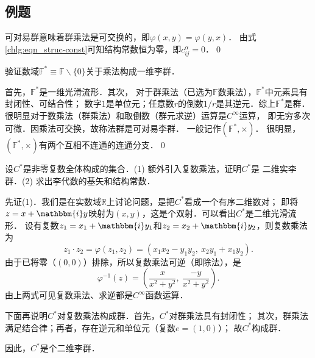 \subsection{例题}
\begin{example}
可对易群意味着群乘法是可交换的，即$\varphi(x,y)=\varphi(y,x)$．
由式\eqref{chlg:eqn_struc-const}可知结构常数恒为零，即$c^\alpha_{ij}=0$．\qed
\end{example}

\begin{example}\label{chlg:exam_Ftimes}
    验证数域$\mathbb{F}^*\equiv\mathbb{F}\backslash\{0\}$关于乘法构成一维李群．
    
    首先，$\mathbb{F}^*$是一维光滑流形．其次，
    对于群乘法（已选为$\mathbb{F}$数乘法），$\mathbb{F}^*$中元素具有封闭性、可结合性；
    数字$1$是单位元；任意数$r$的倒数$1/r$是其逆元．综上$\mathbb{F}^*$是群．
    很明显对于数乘法（群乘法）和取倒数（群元求逆）运算是$C^\infty$运算，
    即无穷多次可微．因乘法可交换，故称法群是可对易李群．
    一般记作$(\mathbb{F}^*,\times)$．
    很明显，$(\mathbb{F}^*,\times)$有两个互相不连通的连通分支．\qed
\end{example}

\begin{example}\label{chlg:exam_complex}
    设$C^*$是非零复数全体构成的集合．(1) 额外引入复数乘法，证明$C^*$是
    二维实李群．(2) 求出李代数的基矢和结构常数．
\end{example}
先证(1)．我们是在实数域$\mathbb{R}$上讨论问题，是把$C^*$看成一个有序二维数对；
即将$z=x+\mathbbm{i} y$映射为$(x,y)$，这是个双射．可以看出$C^*$是二维光滑流形．
设有复数$z_1=x_1+\mathbbm{i} y_1$和$z_2=x_2+\mathbbm{i} y_2$，则复数乘法为
\begin{equation}\label{chlg:eqn_z1z2}
    z_1\cdot z_2 = \varphi(z_1,z_2)=(x_1 x_2-y_1 y_2,\ x_2 y_1+x_1 y_2).
\end{equation}
由于已将零（$(0,0)$）排除，所以复数乘法可逆（即除法），是
\begin{equation}\label{chlg:eqn_z-inv}
    \varphi^{-1}(z)=\left(\frac{x}{x^2+y^2},\ \frac{-y}{x^2+y^2}\right) .
\end{equation}
由上两式可见复数乘法、求逆都是$C^\infty$函数运算．

下面再说明$C^*$对复数乘法构成群．首先，$C^*$对群乘法具有封闭性；
其次，群乘法满足结合律；再者，存在逆元和单位元（复数$e=(1,0)$）；
故$C^*$构成群．

因此，$C^*$是个二维李群．

